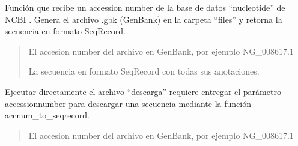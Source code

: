 \documentclass[letterpaper,10pt,spanish]{sphinxmanual}
\begin{document}
\begin{fulllineitems}
\label{\detokenize{descarga:descarga.accnum_to_seqrecord}}
\pysigstartsignatures
{}
\pysigstopsignatures
\sphinxAtStartPar
Función que recibe un accession number de la base de datos “nucleotide” de NCBI
.
Genera el archivo .gbk (GenBank) en la carpeta “files” y retorna la secuencia en formato SeqRecord.
\begin{quote}\begin{description}
\sphinxAtStartPar
{} \textendash{} El accesion number del archivo en GenBank, por ejemplo NG\_008617.1

\sphinxAtStartPar
La secuencia en formato SeqRecord con todas sus anotaciones.

\end{description}\end{quote}

\end{fulllineitems}


\begin{fulllineitems}
\label{\detokenize{descarga:descarga.main}}
\pysigstartsignatures
{}
\pysigstopsignatures
\sphinxAtStartPar
Ejecutar directamente el archivo “descarga” requiere entregar el parámetro \textendash{}accessionnumber para
descargar una secuencia mediante la función accnum\_to\_seqrecord.
\begin{quote}\begin{description}
\sphinxAtStartPar
{} \textendash{} El accesion number del archivo en GenBank, por ejemplo NG\_008617.1

\end{description}\end{quote}

\end{fulllineitems}

\end{document}
